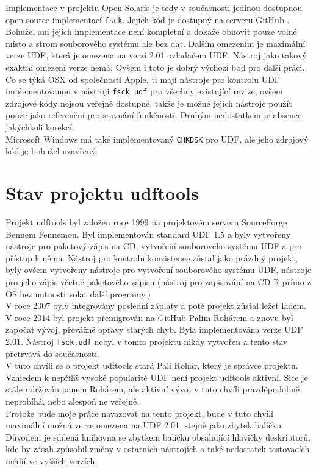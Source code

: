 Implementace v projektu Open Solaris je tedy v současnosti jedinou dostupnou open source implementací \texttt{fsck}. Jejich kód je dostupný na serveru GitHub \cite{solaris-github}. Bohužel ani jejich implementace není kompletní a dokáže obnovit pouze volné místo a strom souborového systému ale bez dat. Dalším omezením je maximální verze UDF, která je omezena na verzi 2.01 ovladačem UDF. Nástroj jako takový exaktní omezení verze nemá. Ovšem i toto je dobrý výchozí bod pro další práci.\\
Co se týká OSX od společnosti Apple, ti mají nástroje pro kontrolu UDF implementovanou v nástroji \texttt{fsck\_udf} pro všechny existující revize, ovšem zdrojové kódy nejsou veřejně dostupné, takže je možné jejich nástroje použít pouze jako referenční pro srovnání funkčnosti. Druhým nedostatkem je absence jakýchkoli korekcí.\\
Microsoft Windows má také implementovaný \texttt{CHKDSK} pro UDF, ale jeho zdrojový kód je bohužel uzavřený.\\

\section{Stav projektu udftools}
\label{sec:stav-udftools}
Projekt udftools byl založen roce 1999 na projektovém serveru SourceForge \cite{udftools-sourceforge} Bennem Fennemou. Byl implementován standard UDF 1.5 a byly vytvořeny nástroje pro paketový zápis na CD, vytvoření souborového systému UDF a pro přístup k němu. Nástroj pro kontrolu konzistence zůstal jako prázdný projekt, byly ovšem vytvořeny nástroje pro vytvoření souborového systému UDF, nástroje pro jeho zápis včetně paketového zápisu (nástroj pro zapisování na CD-R přímo z OS bez nutnosti volat další programy.)\\
V roce 2007 byly integrovány poslední záplaty a poté projekt zůstal ležet ladem. V roce 2014 byl projekt přemigrován na GitHub \cite{udftools-github} Palim Rohárem a znovu byl započat vývoj, převážně opravy starých chyb. Byla implementována verze UDF 2.01. Nástroj \texttt{fsck.udf} nebyl v tomto projektu nikdy vytvořen a tento stav přetrvává do současnosti.\\
V tuto chvíli se o projekt udftools stará Pali Rohár, který je správce projektu. Vzhledem k nepříliš vysoké popularitě UDF není projekt udftools aktivní. Sice je stále udržován panem Rohárem, ale aktivní vývoj v tuto chvíli pravděpodobně neprobíhá, nebo alespoň ne veřejně.\\
Protože bude moje práce navazovat na tento projekt, bude v tuto chvíli maximální možná verze omezena na UDF 2.01, stejně jako zbytek balíčku. Důvodem je sdílená knihovna se zbytkem balíčku obsahující hlavičky deskriptorů, kde by zásah způsobil změny v ostatních nástrojích a také nedostatek testovacích médií ve vyšších verzích.

